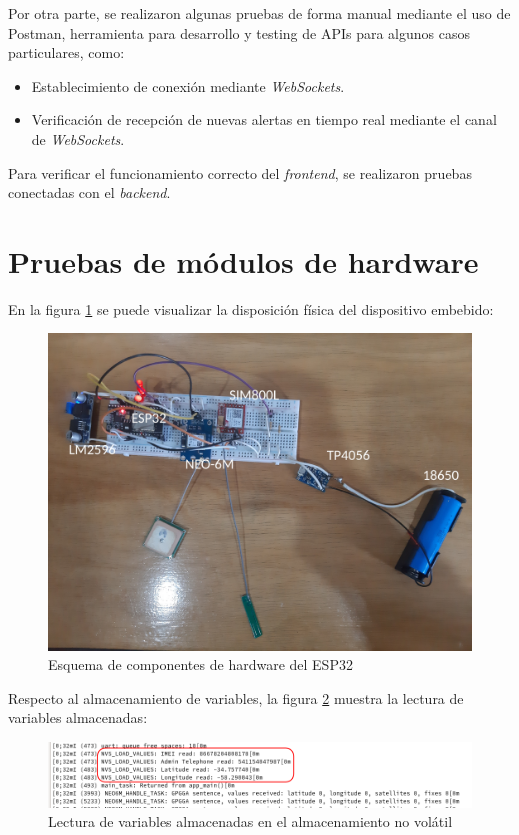 Por otra parte, se realizaron algunas pruebas de forma manual mediante el uso de Postman, herramienta para desarrollo y testing de APIs para algunos casos particulares, como:
\begin{itemize}
	\item Establecimiento de conexión mediante \textit{WebSockets}.
	\item Verificación de recepción de nuevas alertas en tiempo real mediante el canal de \textit{WebSockets}.
\end{itemize}

Para verificar el funcionamiento correcto del \textit{frontend}, se realizaron pruebas conectadas con el \textit{backend}.

\section{Pruebas de módulos de hardware}

En la figura \ref{fig:esp32:fisico} se puede visualizar la disposición física del dispositivo embebido:
\begin{figure}[H]
	\centering
	\includegraphics[width=1\textwidth]{./Figures/esp32-fisico.jpg}
	\caption{Esquema de componentes de hardware del ESP32}
	\label{fig:esp32:fisico}
\end{figure}

Respecto al almacenamiento de variables, la figura \ref{fig:esp32:nvs} muestra la lectura de variables almacenadas:

\begin{figure}[H]
	\centering
	\includegraphics[width=1\textwidth]{./Figures/esp32-nvs.png}
	\caption{Lectura de variables almacenadas en el almacenamiento no volátil}
	\label{fig:esp32:nvs}
\end{figure}

